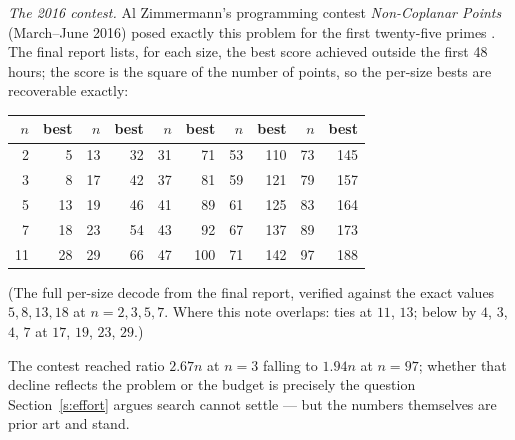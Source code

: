 \documentclass[11pt,a4paper]{article}
\begin{document}
\emph{The 2016 contest.}  Al Zimmermann's programming contest \emph{Non-Coplanar Points}
(March--June 2016) posed exactly this problem for the first twenty-five primes \cite{AZsPCs}.
The final report lists, for each size, the best score achieved outside the first 48 hours; the
score is the square of the number of points, so the per-size bests are recoverable exactly:
\begin{center}
\begin{tabular}{rr|rr|rr|rr|rr}
\toprule
$n$ & best & $n$ & best & $n$ & best & $n$ & best & $n$ & best\\
\midrule
 2 &   5 & 13 &  32 & 31 &  71 & 53 & 110 & 73 & 145\\
 3 &   8 & 17 &  42 & 37 &  81 & 59 & 121 & 79 & 157\\
 5 &  13 & 19 &  46 & 41 &  89 & 61 & 125 & 83 & 164\\
 7 &  18 & 23 &  54 & 43 &  92 & 67 & 137 & 89 & 173\\
11 &  28 & 29 &  66 & 47 & 100 & 71 & 142 & 97 & 188\\
\bottomrule
\end{tabular}

\smallskip
{\small (The full per-size decode from the final report, verified against the exact values $5,8,13,18$
at $n=2,3,5,7$.  Where this note overlaps: ties at $11$, $13$; below by $4$, $3$, $4$, $7$ at $17$, $19$,
$23$, $29$.)}
\end{center}
The contest reached ratio $2.67n$ at $n=3$ falling to $1.94n$ at $n=97$; whether that decline
reflects the problem or the budget is precisely the question Section~\ref{s:effort} argues
search cannot settle --- but the numbers themselves are prior art and stand.
\end{document}
